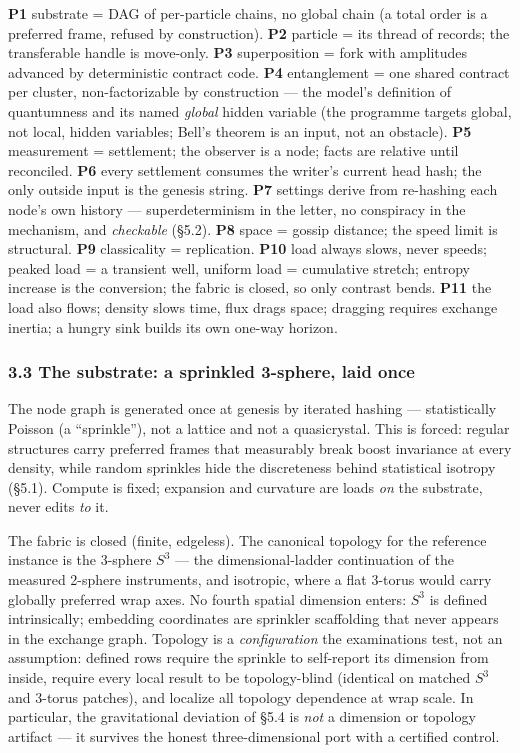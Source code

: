 \documentclass[
  11pt,
]{article}
\begin{document}
\textbf{P1} substrate = DAG of per-particle chains, no global chain (a
total order is a preferred frame, refused by construction). \textbf{P2}
particle = its thread of records; the transferable handle is move-only.
\textbf{P3} superposition = fork with amplitudes advanced by
deterministic contract code. \textbf{P4} entanglement = one shared
contract per cluster, non-factorizable by construction --- the model's
definition of quantumness and its named \emph{global} hidden variable
(the programme targets global, not local, hidden variables; Bell's
theorem is an input, not an obstacle). \textbf{P5} measurement =
settlement; the observer is a node; facts are relative until reconciled.
\textbf{P6} every settlement consumes the writer's current head hash;
the only outside input is the genesis string. \textbf{P7} settings
derive from re-hashing each node's own history --- superdeterminism in
the letter, no conspiracy in the mechanism, and \emph{checkable} (\S{}5.2).
\textbf{P8} space = gossip distance; the speed limit is structural.
\textbf{P9} classicality = replication. \textbf{P10} load always slows,
never speeds; peaked load = a transient well, uniform load = cumulative
stretch; entropy increase is the conversion; the fabric is closed, so
only contrast bends. \textbf{P11} the load also flows; density slows
time, flux drags space; dragging requires exchange inertia; a hungry
sink builds its own one-way horizon.

\subsubsection{3.3 The substrate: a sprinkled 3-sphere, laid
once}\label{the-substrate-a-sprinkled-3-sphere-laid-once}

The node graph is generated once at genesis by iterated hashing ---
statistically Poisson (a ``sprinkle''), not a lattice and not a
quasicrystal. This is forced: regular structures carry preferred frames
that measurably break boost invariance at every density, while random
sprinkles hide the discreteness behind statistical isotropy (\S{}5.1).
Compute is fixed; expansion and curvature are loads \emph{on} the
substrate, never edits \emph{to} it.

The fabric is closed (finite, edgeless). The canonical topology for the
reference instance is the 3-sphere $S^3$ --- the dimensional-ladder
continuation of the measured 2-sphere instruments, and isotropic, where
a flat 3-torus would carry globally preferred wrap axes. No fourth
spatial dimension enters: $S^3$ is defined intrinsically; embedding
coordinates are sprinkler scaffolding that never appears in the exchange
graph. Topology is a \emph{configuration} the examinations test, not an
assumption: defined rows require the sprinkle to self-report its
dimension from inside, require every local result to be topology-blind
(identical on matched $S^3$ and 3-torus patches), and localize all topology
dependence at wrap scale. In particular, the gravitational deviation of
\S{}5.4 is \emph{not} a dimension or topology artifact --- it survives the
honest three-dimensional port with a certified control.
\end{document}
